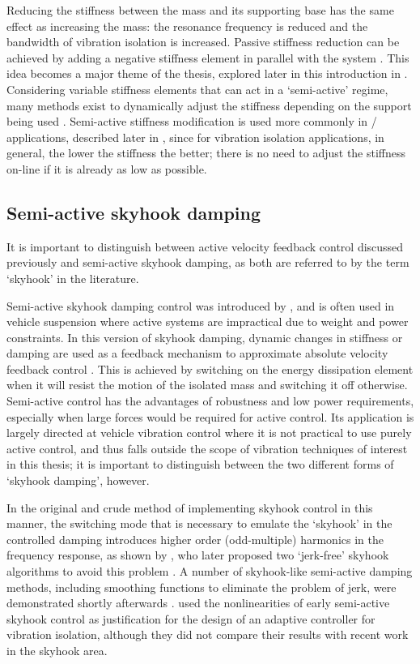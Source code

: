 \documentclass[11pt,a4paper]{memoir}
\begin{document}
Reducing the stiffness between the mass and its supporting base has the same effect as increasing the mass: the resonance frequency is reduced and the bandwidth of vibration isolation is increased.
Passive stiffness reduction can be achieved by adding a negative stiffness element in parallel with the system \cite{lee2007-jsv,xing2005}.
This idea becomes a major theme of the thesis, explored later in this introduction in .
Considering variable stiffness elements that can act in a `semi-active' regime, many methods exist to dynamically adjust the stiffness depending on the support being used \cite[for example]{kidner2002,liu2006-jsv,liu2008-jsv}.
Semi-active stiffness modification is used more commonly in \vibneut/ applications, described later in , since for vibration isolation applications, in general, the lower the stiffness the better; there is no need to adjust the stiffness on-line if it is already as low as possible.

\subsection{Semi-active skyhook damping}

It is important to distinguish between active velocity feedback control discussed previously and semi-active skyhook damping, as both are referred to by the term `skyhook' in the literature.

Semi-active skyhook damping control was introduced by \textcite{karnopp1974-jei}, and is often used in vehicle suspension where active systems are impractical due to weight and power constraints.
In this version of skyhook damping, dynamic changes in stiffness or damping are used as a feedback mechanism to approximate absolute velocity feedback control \cite{ahmadian2004,leavitt2007}.
This is achieved by switching on the energy dissipation element when it will resist the motion of the isolated mass and switching it off otherwise.
Semi-active control has the advantages of robustness and low power requirements, especially when large forces would be required for active control.
Its application is largely directed at vehicle vibration control where it is not practical to use purely active control, and thus falls outside the scope of vibration techniques of interest in this thesis; it is important to distinguish between the two different forms of `skyhook damping', however.

In the original and crude method of implementing skyhook control in this manner, the switching mode that is necessary to emulate the `skyhook' in the controlled damping introduces higher order (odd-multiple) harmonics in the frequency response, as shown by \textcite{ahmadian2001}, who later proposed two `jerk-free' skyhook algorithms to avoid this problem \cite{ahmadian2004}.
A number of skyhook-like semi-active damping methods, including smoothing functions to eliminate the problem of jerk, were demonstrated shortly afterwards
\cite{liu2005}.
\textcite{song2007} used the nonlinearities of early semi-active skyhook control as justification for the design of an adaptive controller for vibration isolation, although they did not compare their results with recent work in the skyhook area.
\end{document}
